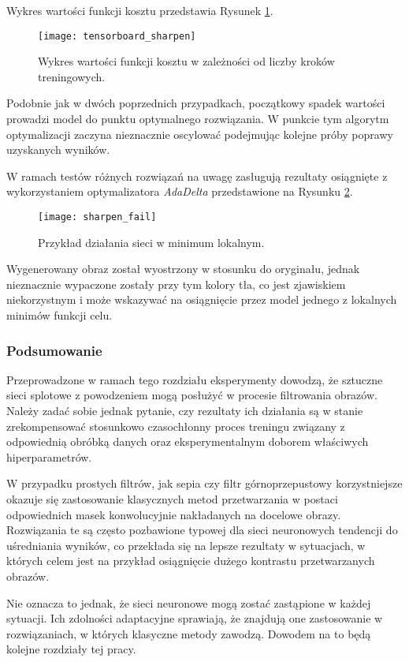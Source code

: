     Wykres wartości funkcji kosztu przedstawia Rysunek \ref{fig:tensorboard_sharpen}.

    \begin{figure}[h!]
      \centering
      \texttt{[image: tensorboard\_sharpen]}
      \caption[Wykres wartości funkcji kosztu w zależności od liczby kroków treningowych - źródło: Rysunek własny]{Wykres wartości funkcji kosztu w zależności od liczby kroków treningowych.}
      \label{fig:tensorboard_sharpen}
    \end{figure}

    Podobnie jak w dwóch poprzednich przypadkach, początkowy spadek wartości
    prowadzi model do punktu optymalnego rozwiązania. W punkcie tym algorytm optymalizacji
    zaczyna nieznacznie oscylować podejmując kolejne próby poprawy uzyskanych wyników.

    W ramach testów różnych rozwiązań na uwagę zasługują rezultaty osiągnięte
    z wykorzystaniem optymalizatora \textit{AdaDelta} przedstawione na Rysunku \ref{fig:sharpen_fail}.

    \begin{figure}[h!]
      \centering
      \texttt{[image: sharpen\_fail]}
      \caption[Przykład działania sieci w minimum lokalnym - źródło: Rysunek własny]{Przykład działania sieci w minimum lokalnym.}
      \label{fig:sharpen_fail}
    \end{figure}

    Wygenerowany obraz został wyostrzony w stosunku do oryginału, jednak
    nieznacznie wypaczone zostały przy tym kolory tła, co jest zjawiskiem niekorzystnym i
    może wskazywać na osiągnięcie przez model jednego z lokalnych minimów funkcji celu.

  \subsubsection{Podsumowanie}

    Przeprowadzone w ramach tego rozdziału eksperymenty dowodzą, że sztuczne
    sieci splotowe z powodzeniem mogą posłużyć w procesie filtrowania obrazów.
    Należy zadać sobie jednak pytanie, czy rezultaty ich działania są w stanie
    zrekompensować stosunkowo czasochłonny proces treningu związany z odpowiednią
    obróbką danych oraz eksperymentalnym doborem właściwych hiperparametrów.

    W przypadku prostych filtrów, jak sepia czy filtr górnoprzepustowy korzystniejsze
    okazuje się zastosowanie klasycznych metod przetwarzania w postaci
    odpowiednich masek konwolucyjnie nakładanych na docelowe obrazy. Rozwiązania te
    są często pozbawione typowej dla sieci neuronowych tendencji do uśredniania
    wyników, co przekłada się na lepsze rezultaty w sytuacjach, w których celem jest
    na przykład osiągnięcie dużego kontrastu przetwarzanych obrazów.

    Nie oznacza to jednak, że sieci neuronowe mogą zostać zastąpione w każdej sytuacji.
    Ich zdolności adaptacyjne sprawiają, że znajdują one zastosowanie w rozwiązaniach, w
    których klasyczne metody zawodzą. Dowodem na to będą kolejne rozdziały tej pracy.
